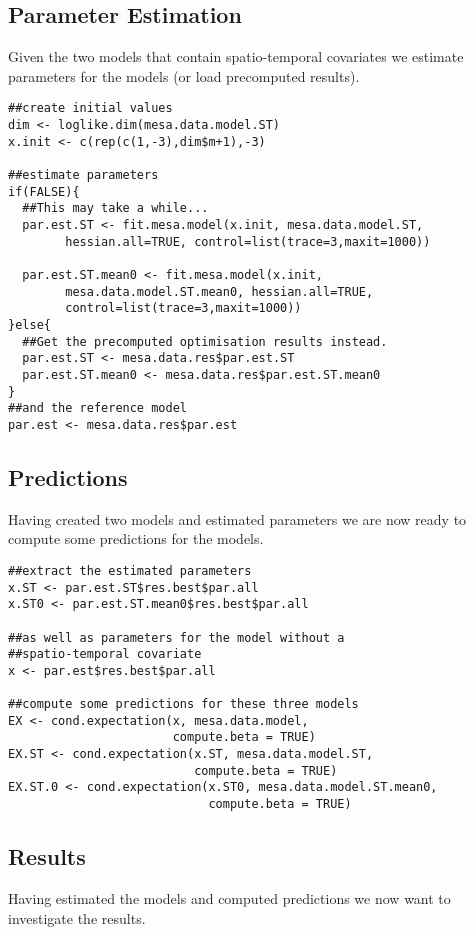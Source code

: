 \subsection{Parameter Estimation}
Given the two models that contain spatio\hyp{}temporal covariates we estimate
parameters for the models (or load precomputed results).
\vspace*{-0.5\baselineskip}
\begin{verbatim}
##create initial values
dim <- loglike.dim(mesa.data.model.ST)
x.init <- c(rep(c(1,-3),dim$m+1),-3)

##estimate parameters
if(FALSE){
  ##This may take a while...
  par.est.ST <- fit.mesa.model(x.init, mesa.data.model.ST,
        hessian.all=TRUE, control=list(trace=3,maxit=1000))

  par.est.ST.mean0 <- fit.mesa.model(x.init,
        mesa.data.model.ST.mean0, hessian.all=TRUE,
        control=list(trace=3,maxit=1000))
}else{
  ##Get the precomputed optimisation results instead.
  par.est.ST <- mesa.data.res$par.est.ST
  par.est.ST.mean0 <- mesa.data.res$par.est.ST.mean0
}
##and the reference model
par.est <- mesa.data.res$par.est
\end{verbatim}

\subsection{Predictions}
Having created two models and estimated parameters we are now ready 
to compute some predictions for the models.
\vspace*{-0.5\baselineskip}
\begin{verbatim}
##extract the estimated parameters
x.ST <- par.est.ST$res.best$par.all
x.ST0 <- par.est.ST.mean0$res.best$par.all

##as well as parameters for the model without a 
##spatio-temporal covariate
x <- par.est$res.best$par.all

##compute some predictions for these three models
EX <- cond.expectation(x, mesa.data.model, 
                       compute.beta = TRUE)
EX.ST <- cond.expectation(x.ST, mesa.data.model.ST,
                          compute.beta = TRUE)
EX.ST.0 <- cond.expectation(x.ST0, mesa.data.model.ST.mean0,
                            compute.beta = TRUE)
\end{verbatim}

\subsection{Results}
Having estimated the models and computed predictions we 
now want to investigate the results.

